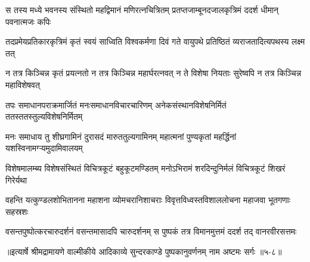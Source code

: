 
\twolineshloka
{स तस्य मध्ये भवनस्य संस्थितो महद्विमानं मणिरत्नचित्रितम्}
{प्रतप्तजाम्बूनदजालकृत्रिमं ददर्श धीमान् पवनात्मजः कपिः} %

\twolineshloka
{तदप्रमेयप्रतिकारकृत्रिमं कृतं स्वयं साध्विति विश्वकर्मणा}
{दिवं गते वायुपथे प्रतिष्ठितं व्यराजतादित्यपथस्य लक्ष्म तत्} %

\twolineshloka
{न तत्र किञ्चिन्न कृतं प्रयत्नतो न तत्र किञ्चिन्न महार्घरत्नवत्}
{न ते विशेषा नियताः सुरेष्वपि न तत्र किञ्चिन्न महाविशेषवत्} %

\twolineshloka
{तपः समाधानपराक्रमार्जितं मनःसमाधानविचारचारिणम्}
{अनेकसंस्थानविशेषनिर्मितं ततस्ततस्तुल्यविशेषनिर्मितम्} %

\twolineshloka
{मनः समाधाय तु शीघ्रगामिनं दुरासदं मारुततुल्यगामिनम्}
{महात्मनां पुण्यकृतां महर्द्धिनां यशस्विनामग्ऱ्यमुदामिवालयम्} %

\twolineshloka
{विशेषमालम्ब्य विशेषसंस्थितं विचित्रकूटं बहुकूटमण्डितम्}
{मनोऽभिरामं शरदिन्दुनिर्मलं विचित्रकूटं शिखरं गिरेर्यथा} %

\twolineshloka
{वहन्ति यत्कुण्डलशोभितानना महाशना व्योमचरानिशाचराः}
{विवृत्तविध्वस्तविशाललोचना महाजवा भूतगणाः सहस्रशः} %

\twolineshloka
{वसन्तपुष्पोत्करचारुदर्शनं वसन्तमासादपि चारुदर्शनम्}
{स पुष्पकं तत्र विमानमुत्तमं ददर्श तद् वानरवीरसत्तमः} %


॥इत्यार्षे श्रीमद्रामायणे वाल्मीकीये आदिकाव्ये सुन्दरकाण्डे पुष्पकानुवर्णनम् नाम अष्टमः सर्गः ॥५-८॥
